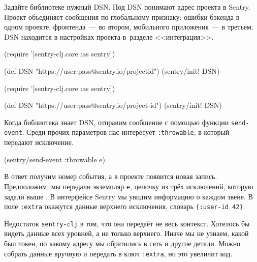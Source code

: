 
Задайте библиотеке нужный DSN. Под DSN понимают адрес проекта в Sentry. Проект
объединяет сообщения по глобальному признаку: ошибки бэкенда в одном проекте,
фронтенда~--- во втором, мобильного приложения~--- в третьем. DSN находится в
настройках проекта в~разделе <<интеграция>>.

\ifx\DEVICETYPE\MOBILE

\begin{english}
  \begin{clojure}
(require '[sentry-clj.core :as sentry])

(def DSN
 "https://user:pass@sentry.io/projectid")
(sentry/init! DSN)
  \end{clojure}
\end{english}

\else

\begin{english}
  \begin{clojure}
(require '[sentry-clj.core :as sentry])

(def DSN "https://user:pass@sentry.io/project-id")
(sentry/init! DSN)
  \end{clojure}
\end{english}

\fi

Когда библиотека знает DSN, отправим сообщение с помощью функции
\verb|send-event|. Среди прочих параметров нас интересует \verb|:throwable|, в
который передают исключение.

\begin{english}
  \begin{clojure}
(sentry/send-event {:throwable e})
  \end{clojure}
\end{english}

В ответ получим номер события, а в проекте появится новая запись. Предположим,
мы передали экземпляр \verb|e|, цепочку из трёх исключений, которую задали
выше . В интерфейсе Sentry мы увидим информацию о каждом звене. В
поле \verb|:extra| окажутся данные верхнего исключения, словарь
\verb|{:user-id 42}|.

Недостаток \verb|sentry-clj| в том, что она передаёт не весь
контекст. Хотелось бы видеть данные всех уровней, а не только верхнего. Иначе мы
не узнаем, какой был токен, по какому адресу мы обратились в сеть и другие
детали. Можно собрать данные вручную и передать в ключ \verb|:extra|, но это
увеличит код.


